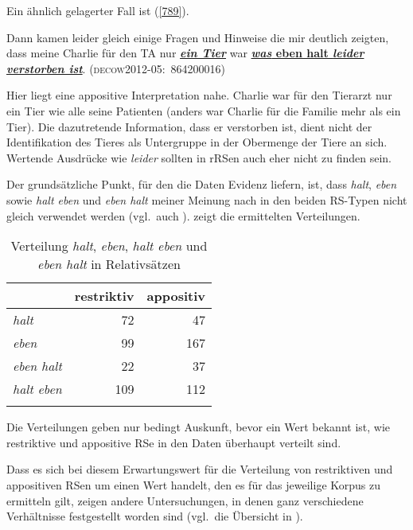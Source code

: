 Ein ähnlich gelagerter Fall ist (\ref{789}).
	
\begin{exe}
	\ex\label{789} 

	 Dann kamen leider gleich einige Fragen und Hinweise die mir deutlich zeigten, dass meine Charlie für den TA nur \ul{\textbf{\textit{ein Tier}}} war \ul{\textbf{\textit{was} eben halt \textit{leider verstorben ist}}}. 
	\hfill\hbox{\scshape(decow2012-05: 864200016)}
\end{exe}	    					   
Hier liegt eine appositive Interpretation nahe. Charlie war für den Tierarzt nur ein Tier wie alle seine Patienten (anders war Charlie für die Familie mehr als ein Tier). Die dazutretende Information, dass er verstorben ist, dient nicht der Identifikation des Tieres als Untergruppe in der Obermenge der Tiere an sich. Wertende Ausdrücke wie \textit{leider} sollten in rRSen auch eher nicht zu finden sein.

\label{sec:ergeb}
Der grundsätzliche Punkt, für den die Daten Evidenz liefern, ist, dass \textit{halt}, \textit{eben} sowie \textit{halt eben} und \textit{eben halt} meiner Meinung nach in den beiden RS-Typen nicht gleich verwendet werden (vgl.\ auch \citealt[169--171]{Mueller2016a}).  zeigt die ermittelten Verteilungen.

\begin{table}
	\caption{\label{tab:790}Verteilung \textit{halt}, \textit{eben}, \textit{halt eben} und \textit{eben halt} in Relativsätzen}
     \begin{tabular}{lrr}
     \lsptoprule
	  & {restriktiv} & {appositiv}\\
	 \midrule
	 \textit{halt} & 72 & 47\\
	 \textit{eben} & 99 & 167\\
	 \textit{eben halt} & 22 & 37\\	 
	 \textit{halt eben} & 109 & 112\\
\lspbottomrule
     \end{tabular}
\end{table}
Die Verteilungen geben nur bedingt Auskunft, bevor ein Wert bekannt ist, wie restriktive und appositive RSe in den Daten überhaupt verteilt sind. 

Dass es sich bei diesem Erwartungswert für die Verteilung von restriktiven und appositiven RSen um einen Wert handelt, den es für das jeweilige Korpus zu ermitteln gilt, zeigen andere Untersuchungen, in denen ganz verschiedene Verhältnisse festgestellt worden sind (vgl.\ die Übersicht in ).

